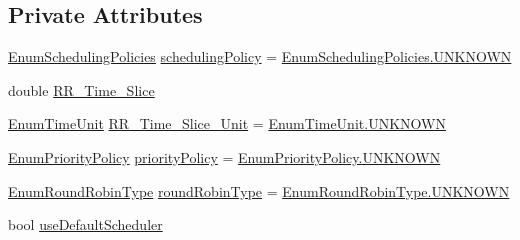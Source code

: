 \subsection*{Private Attributes}
\begin{DoxyCompactItemize}
\item 
\hyperlink{namespace_c_p_u___o_s___simulator_1_1_operating___system_ad0cdaacf9652394d23fa29109640fe08}{Enum\+Scheduling\+Policies} \hyperlink{class_c_p_u___o_s___simulator_1_1_operating___system_1_1_o_s_core_a379d53a0d661ac56f75c2676bed68b06}{scheduling\+Policy} = \hyperlink{namespace_c_p_u___o_s___simulator_1_1_operating___system_aea0b669d1bbf5690ae34ac2f8bef9470a696b031073e74bf2cb98e5ef201d4aa3}{Enum\+Scheduling\+Policies.\+U\+N\+K\+N\+O\+W\+N}
\item 
double \hyperlink{class_c_p_u___o_s___simulator_1_1_operating___system_1_1_o_s_core_a34a8be2fd9187764366ca5a7b48d764e}{R\+R\+\_\+\+Time\+\_\+\+Slice}
\item 
\hyperlink{namespace_c_p_u___o_s___simulator_1_1_operating___system_a0553d0bc2513aec52caa769acf994d5c}{Enum\+Time\+Unit} \hyperlink{class_c_p_u___o_s___simulator_1_1_operating___system_1_1_o_s_core_ac0f4c6d450108d3b51e9fc7f9dc930ce}{R\+R\+\_\+\+Time\+\_\+\+Slice\+\_\+\+Unit} = \hyperlink{namespace_c_p_u___o_s___simulator_1_1_operating___system_aea0b669d1bbf5690ae34ac2f8bef9470a696b031073e74bf2cb98e5ef201d4aa3}{Enum\+Time\+Unit.\+U\+N\+K\+N\+O\+W\+N}
\item 
\hyperlink{namespace_c_p_u___o_s___simulator_1_1_operating___system_a3a9286a473bd079e9c65908c0378fa00}{Enum\+Priority\+Policy} \hyperlink{class_c_p_u___o_s___simulator_1_1_operating___system_1_1_o_s_core_a866fa4ff3b8aadb3eb57188f6a87e148}{priority\+Policy} = \hyperlink{namespace_c_p_u___o_s___simulator_1_1_operating___system_aea0b669d1bbf5690ae34ac2f8bef9470a696b031073e74bf2cb98e5ef201d4aa3}{Enum\+Priority\+Policy.\+U\+N\+K\+N\+O\+W\+N}
\item 
\hyperlink{namespace_c_p_u___o_s___simulator_1_1_operating___system_a4c7effb8b6725df52018a3a14cede96e}{Enum\+Round\+Robin\+Type} \hyperlink{class_c_p_u___o_s___simulator_1_1_operating___system_1_1_o_s_core_a4a891b4c9ed3aa97c389bccab0b2687d}{round\+Robin\+Type} = \hyperlink{namespace_c_p_u___o_s___simulator_1_1_operating___system_aea0b669d1bbf5690ae34ac2f8bef9470a696b031073e74bf2cb98e5ef201d4aa3}{Enum\+Round\+Robin\+Type.\+U\+N\+K\+N\+O\+W\+N}
\item 
bool \hyperlink{class_c_p_u___o_s___simulator_1_1_operating___system_1_1_o_s_core_a9e4390ec19f02a66b2c8ba829fad0e49}{use\+Default\+Scheduler}

\end{DoxyCompactItemize}
